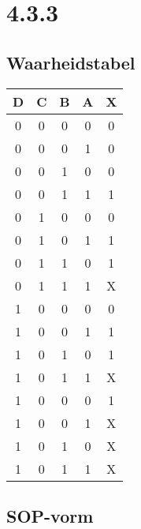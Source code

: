 \documentclass[11pt, a4paper]{report}
\begin{document}
\vspace{10 cm}

\newpage

\section*{4.3.3}

\subsection*{Waarheidstabel}

\begin{tabular}{| c c c c | c |}
  \hline
  D & C & B & A & X \\
  \hline
  0 & 0 & 0 & 0 & 0 \\
  0 & 0 & 0 & 1 & 0 \\
  0 & 0 & 1 & 0 & 0 \\
  0 & 0 & 1 & 1 & 1 \\
  \hline
  0 & 1 & 0 & 0 & 0 \\
  0 & 1 & 0 & 1 & 1 \\
  0 & 1 & 1 & 0 & 1 \\
  0 & 1 & 1 & 1 & X \\
  \hline
  1 & 0 & 0 & 0 & 0 \\
  1 & 0 & 0 & 1 & 1 \\
  1 & 0 & 1 & 0 & 1 \\
  1 & 0 & 1 & 1 & X \\
  \hline
  1 & 0 & 0 & 0 & 1 \\
  1 & 0 & 0 & 1 & X \\
  1 & 0 & 1 & 0 & X \\
  1 & 0 & 1 & 1 & X \\
  \hline
\end{tabular}

\subsection*{SOP-vorm}
\end{document}
